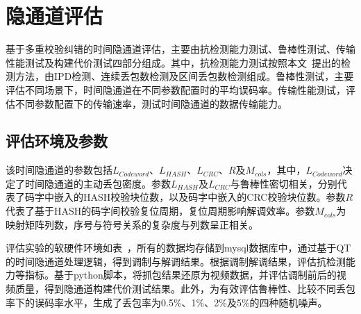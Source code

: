 \section{隐通道评估}
\label{chap:hash:result}

基于多重校验纠错的时间隐通道评估，主要由抗检测能力测试、鲁棒性测试、传输性能测试及构建代价测试四部分组成。其中，抗检测能力测试按照本文\ 提出的检测方法，由IPD检测、连续丢包数检测及区间丢包数检测组成。鲁棒性测试，主要评估不同场景下，时间隐通道在不同参数配置时的平均误码率。传输性能测试，评估不同参数配置下的传输速率，测试时间隐通道的数据传输能力。

\subsection{评估环境及参数}
\label{chap:hash:result:parameters}

该时间隐通道的参数包括$L_{Codeword}$、$L_{HASH}$、$L_{CRC}$、$R$及$M_{cols}$，其中，$L_{Codeword}$决定了时间隐通道的主动丢包密度。参数$L_{HASH}$及$L_{CRC}$与鲁棒性密切相关，分别代表了码字中嵌入的HASH校验块位数，以及码字中嵌入的CRC校验块位数。参数$R$代表了基于HASH的码字间校验复位周期，复位周期影响解调效率。参数$M_{cols}$为映射矩阵列数，序号与符号关系的复杂度与列数呈正相关。


评估实验的软硬件环境如表\ ，所有的数据均存储到mysql数据库中，通过基于QT的时间隐通道处理逻辑，得到调制与解调结果。根据调制解调结果，评估抗检测能力等指标。基于python脚本，将抓包结果还原为视频数据，并评估调制前后的视频质量，得到隐通道构建代价测试结果。此外，为有效评估鲁棒性、比较不同丢包率下的误码率水平，生成了丢包率为0.5\%、1\%、2\%及5\%的四种随机噪声。

